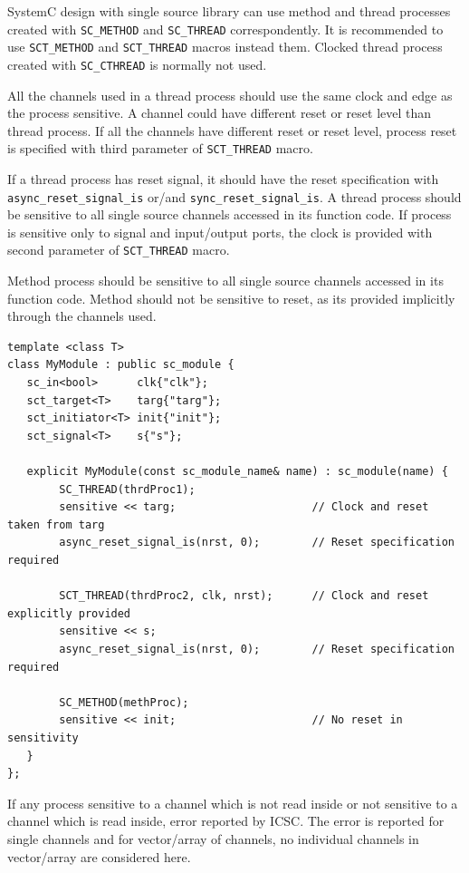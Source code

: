 SystemC design with single source library can use method and thread processes created with {\tt SC\_METHOD} and {\tt SC\_THREAD} correspondently. It is recommended to use {\tt SCT\_METHOD} and {\tt SCT\_THREAD} macros instead them. Clocked thread process created with {\tt SC\_CTHREAD} is normally not used.

All the channels used in a thread process should use the same clock and edge as the process sensitive. A channel could have different reset or reset level than thread process. If all the channels have different reset or reset level, process reset is specified with third parameter of {\tt SCT\_THREAD} macro.

If a thread process has reset signal, it should have the reset specification with {\tt async\_reset\_signal\_is} or/and {\tt sync\_reset\_signal\_is}. A thread process should be sensitive to all single source channels accessed in its function code. If process is sensitive only to signal and input/output ports, the clock is provided with second parameter of {\tt SCT\_THREAD} macro.

Method process should be sensitive to all single source channels accessed in its function code. Method should not be sensitive to reset, as its provided implicitly through the channels used.

\begin{lstlisting}[style=mycpp]
template <class T>
class MyModule : public sc_module {
   sc_in<bool>      clk{"clk"};
   sct_target<T>    targ{"targ"};
   sct_initiator<T> init{"init"};
   sct_signal<T>    s{"s"};

   explicit MyModule(const sc_module_name& name) : sc_module(name) {
        SC_THREAD(thrdProc1); 
        sensitive << targ;                     // Clock and reset taken from targ
        async_reset_signal_is(nrst, 0);        // Reset specification required

        SCT_THREAD(thrdProc2, clk, nrst);      // Clock and reset explicitly provided
        sensitive << s;
        async_reset_signal_is(nrst, 0);        // Reset specification required 

        SC_METHOD(methProc); 
        sensitive << init;                     // No reset in sensitivity
   }
};
\end{lstlisting}

If any process sensitive to a channel which is not read inside or not sensitive to a channel which is read inside, error reported by ICSC. The error is reported for single channels and for vector/array of channels, no individual channels in vector/array are considered here.


